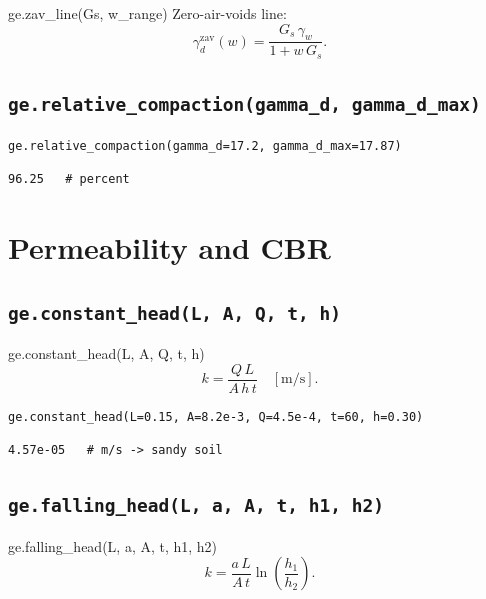 \documentclass[11pt,a4paper,openany]{book}
\newcommand{\gammaw}{\gamma_w}
\begin{document}
\begin{funcbox}{ge.zav\_line(Gs, w\_range)}
Zero-air-voids line:
\[
\gamma_d^{\text{zav}}(w) = \frac{G_s\,\gammaw}{1 + w\,G_s}.
\]
\end{funcbox}

\subsection{\texttt{ge.relative\_compaction(gamma\_d, gamma\_d\_max)}}

\begin{lstlisting}
ge.relative_compaction(gamma_d=17.2, gamma_d_max=17.87)
\end{lstlisting}
\begin{lstlisting}[style=output]
96.25   # percent
\end{lstlisting}

\section{Permeability and CBR}

\subsection{\texttt{ge.constant\_head(L, A, Q, t, h)}}

\begin{funcbox}{ge.constant\_head(L, A, Q, t, h)}
\[
k = \frac{Q\,L}{A\,h\,t}\quad[\si{\meter\per\second}].
\]
\end{funcbox}

\begin{lstlisting}
ge.constant_head(L=0.15, A=8.2e-3, Q=4.5e-4, t=60, h=0.30)
\end{lstlisting}
\begin{lstlisting}[style=output]
4.57e-05   # m/s -> sandy soil
\end{lstlisting}

\subsection{\texttt{ge.falling\_head(L, a, A, t, h1, h2)}}

\begin{funcbox}{ge.falling\_head(L, a, A, t, h1, h2)}
\[
k = \frac{a\,L}{A\,t}\ln\!\left(\frac{h_1}{h_2}\right).
\]
\end{funcbox}
\end{document}
